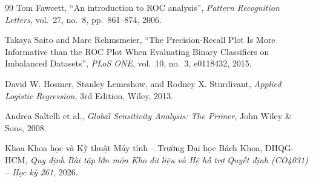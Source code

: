 \documentclass[a4paper,11pt]{article}
\begin{document}
\begin{thebibliography}{99}
        Tom Fawcett,
        ``An introduction to ROC analysis'',
        \textit{Pattern Recognition Letters}, vol.~27, no.~8, pp.~861--874, 2006.

        Takaya Saito and Marc Rehmsmeier,
        ``The Precision-Recall Plot Is More Informative than the ROC Plot When Evaluating Binary Classifiers on Imbalanced Datasets'',
        \textit{PLoS ONE}, vol.~10, no.~3, e0118432, 2015.

        David W. Hosmer, Stanley Lemeshow, and Rodney X. Sturdivant,
        \textit{Applied Logistic Regression},
        3rd Edition, Wiley, 2013.

        Andrea Saltelli et al.,
        \textit{Global Sensitivity Analysis: The Primer},
        John Wiley \& Sons, 2008.

        Khoa Khoa học và Kỹ thuật Máy tính -- Trường Đại học Bách Khoa, ĐHQG-HCM,
        \textit{Quy định Bài tập lớn môn Kho dữ liệu và Hệ hỗ trợ Quyết định (CO4031) -- Học kỳ 261},
        2026.
    \end{thebibliography}

    \newpage
    
\end{document}
